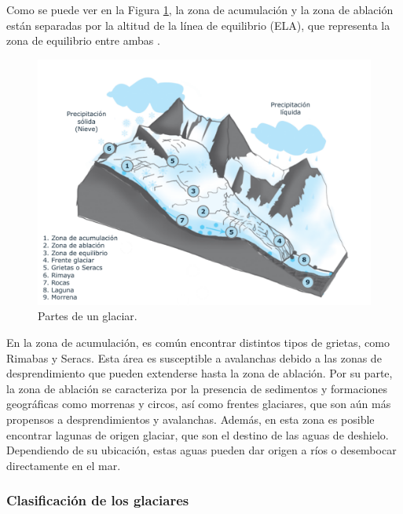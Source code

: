 Como se puede ver en la Figura \ref{fig:PartesGlaciar}, la zona de acumulación y la zona de ablación están separadas por la altitud de la línea de equilibrio (ELA), que representa la zona de equilibrio entre ambas \cite{ideam2012glaciares}.

\begin{figure}[H]
    \begin{center}
        \includegraphics[width=1\textwidth]{Images/PartesGlaciar.pdf}
    \end{center}
    \caption{Partes de un glaciar.}
    \label{fig:PartesGlaciar}
\end{figure}

En la zona de acumulación, es común encontrar distintos tipos de grietas, como Rimabas y Seracs. Esta área es susceptible a avalanchas debido a las zonas de desprendimiento que pueden extenderse hasta la zona de ablación. Por su parte, la zona de ablación se caracteriza por la presencia de sedimentos y formaciones geográficas como morrenas y circos, así como frentes glaciares, que son aún más propensos a desprendimientos y avalanchas. Además, en esta zona es posible encontrar lagunas de origen glaciar, que son el destino de las aguas de deshielo. Dependiendo de su ubicación, estas aguas pueden dar origen a ríos o desembocar directamente en el mar.

\subsubsection{Clasificación de los glaciares}

